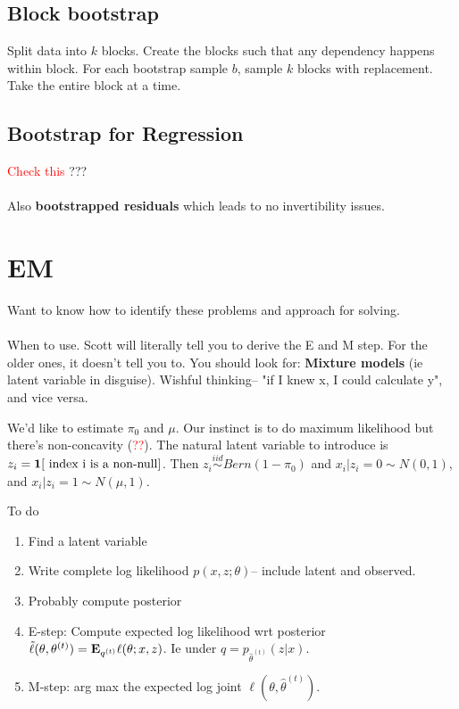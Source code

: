 \documentclass{article}
\newcommand\myworries[1]{\textcolor{red}{#1}}
\newcommand{\simiid}{\overset{iid}\sim }
\begin{document}
\subsection{Block bootstrap}
Split data into $k$ blocks. Create the blocks such that any dependency happens within block. For each bootstrap sample $b$, sample $k$ blocks with replacement. Take the entire block at a time. 


\subsection{Bootstrap for Regression}
\myworries{Check this} ???\\ \\ 

Also \textbf{bootstrapped residuals} which leads to no invertibility issues. 
\section{EM}
Want to know how to identify these problems and approach for solving. \\\\

When to use. Scott will literally tell you to derive the E and M step. For the older ones, it doesn't tell you to. You should look for:\textbf{ Mixture models }(ie latent variable in disguise). Wishful thinking-- "if I knew x, I could calculate y", and vice versa. 

\begin{example}[$X_i \sim \pi_0 N(0,1) + (1-\pi_0) N(\mu,1)$]
We'd like to estimate $\pi_0$ and $\mu$. Our instinct is to do maximum likelihood but there's non-concavity (\myworries{??}). The natural latent variable to introduce is $z_i = \boldsymbol{1}[\text{ index i is a non-null}]$. Then $z_i\simiid Bern(1-\pi_0)$ and $x_i |z_i=0 \sim N(0,1)$, and $x_i | z_i=1 \sim N(\mu,1)$. 
\end{example}

\begin{recipe}[EM Recipe]
To do
\begin{enumerate}
	\item Find a latent variable
	\item Write complete log likelihood $p(x,z;\theta)$-- include latent and observed.
	\item Probably compute posterior 
	\item E-step: Compute expected log likelihood wrt posterior $\tilde \ell (\theta, \theta^{(t)}) = \mathbf{E}_{q^{(t)}} \ell(\theta;x,z)$. Ie under $q= p_{\hat \theta^{(t)}} (z|x)$.
	\item M-step: arg max the expected log joint $\ell (\theta, \hat \theta^{(t)})$.  
\end{enumerate}
\end{recipe}
\end{document}
